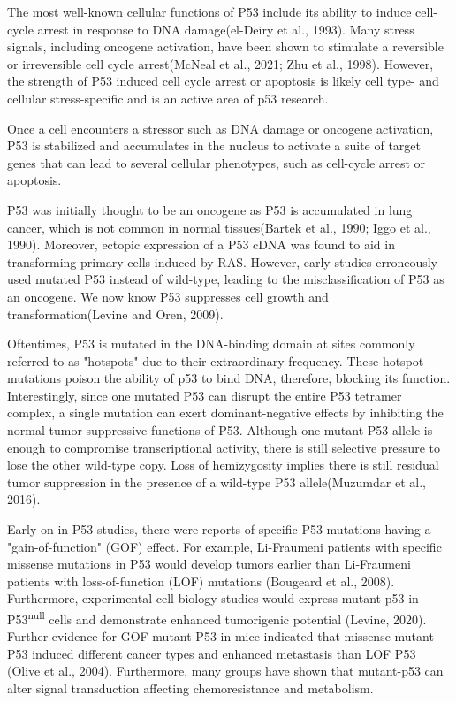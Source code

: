 The most well-known cellular functions of P53 include its ability to induce cell-cycle arrest in response to DNA damage(el-Deiry et al., 1993). Many stress signals, including oncogene activation, have been shown to stimulate a reversible or irreversible cell cycle arrest(McNeal et al., 2021; Zhu et al., 1998). However, the strength of P53 induced cell cycle arrest or apoptosis is likely cell type- and cellular stress-specific and is an active area of p53 research.

Once a cell encounters a stressor such as DNA damage or oncogene activation, P53 is stabilized and accumulates in the nucleus to activate a suite of target genes that can lead to several cellular phenotypes, such as cell-cycle arrest or apoptosis.

P53 was initially thought to be an oncogene as P53 is accumulated in lung cancer, which is not common in normal tissues(Bartek et al., 1990; Iggo et al., 1990). Moreover, ectopic expression of a P53 cDNA was found to aid in transforming primary cells induced by RAS. However, early studies erroneously used mutated P53 instead of wild-type, leading to the misclassification of P53 as an oncogene. We now know P53 suppresses cell growth and transformation(Levine and Oren, 2009).

Oftentimes, P53 is mutated in the DNA-binding domain at sites commonly referred to as "hotspots" due to their extraordinary frequency. These hotspot mutations poison the ability of p53 to bind DNA, therefore, blocking its function. Interestingly, since one mutated P53 can disrupt the entire P53 tetramer complex, a single mutation can exert dominant-negative effects by inhibiting the normal tumor-suppressive functions of P53. Although one mutant P53 allele is enough to compromise transcriptional activity, there is still selective pressure to lose the other wild-type copy. Loss of hemizygosity implies there is still residual tumor suppression in the presence of a wild-type P53 allele(Muzumdar et al., 2016).

Early on in P53 studies, there were reports of specific P53 mutations having a "gain-of-function" (GOF) effect. For example, Li-Fraumeni patients with specific missense mutations in P53 would develop tumors earlier than Li-Fraumeni patients with loss-of-function (LOF) mutations (Bougeard et al., 2008). Furthermore, experimental cell biology studies would express mutant-p53 in P53\textsuperscript{null} cells and demonstrate enhanced tumorigenic potential (Levine, 2020). Further evidence for GOF mutant-P53 in mice indicated that missense mutant P53 induced different cancer types and enhanced metastasis than LOF P53 (Olive et al., 2004). Furthermore, many groups have shown that mutant-p53 can alter signal transduction affecting chemoresistance and metabolism.

